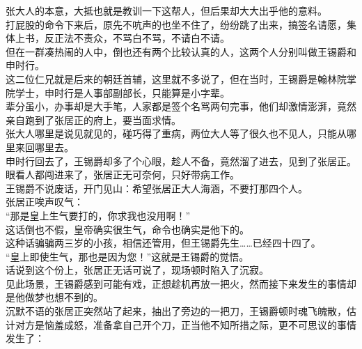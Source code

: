 \begin{multicols}{\theparacolNo}
张大人的本意，大抵也就是教训一下这帮人，但后果却大大出乎他的意料。\\

打屁股的命令下来后，原先不吭声的也坐不住了，纷纷跳了出来，搞签名请愿，集体上书，反正法不责众，不骂白不骂，不请白不请。\\

但在一群凑热闹的人中，倒也还有两个比较认真的人，这两个人分别叫做王锡爵和申时行。\\

这二位仁兄就是后来的朝廷首辅，这里就不多说了，但在当时，王锡爵是翰林院掌院学士，申时行是人事部副部长，只能算是小字辈。\\

辈分虽小，办事却是大手笔，人家都是签个名骂两句完事，他们却激情澎湃，竟然亲自跑到了张居正的府上，要当面求情。\\

张大人哪里是说见就见的，碰巧得了重病，两位大人等了很久也不见人，只能从哪里来回哪里去。\\

申时行回去了，王锡爵却多了个心眼，趁人不备，竟然溜了进去，见到了张居正。\\

眼看人都闯进来了，张居正无可奈何，只好带病工作。\\

王锡爵不说废话，开门见山：希望张居正大人海涵，不要打那四个人。\\

张居正唉声叹气：\\

“那是皇上生气要打的，你求我也没用啊！”\\

这话倒也不假，皇帝确实很生气，命令也确实是他下的。\\

这种话骗骗两三岁的小孩，相信还管用，但王锡爵先生……已经四十四了。\\

“皇上即使生气，那也是因为您！”这就是王锡爵的觉悟。\\

话说到这个份上，张居正无话可说了，现场顿时陷入了沉寂。\\

见此场景，王锡爵感到可能有戏，正想趁机再放一把火，然而接下来发生的事情却是他做梦也想不到的。\\

沉默不语的张居正突然站了起来，抽出了旁边的一把刀，王锡爵顿时魂飞魄散，估计对方是恼羞成怒，准备拿自己开个刀，正当他不知所措之际，更不可思议的事情发生了：\\


\end{multicols}
